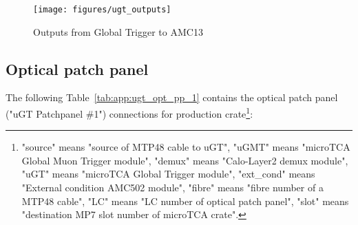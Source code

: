 \begin{figure}[htb]
\centering
\texttt{[image: figures/ugt\_outputs]}
\caption{Outputs from Global Trigger to AMC13}
\label{fig:app:ugt_outputs}
\end{figure}

\clearpage

\subsection{Optical patch panel}\label{sec:app:app_d}

The following Table~\ref{tab:app:ugt_opt_pp_1} contains the optical patch panel ("uGT Patchpanel \#1") connections for production crate\footnote{"source" means "source of MTP48 cable to uGT", "uGMT" means "microTCA Global Muon Trigger module", "demux" means "Calo-Layer2 demux module", "uGT" means "microTCA Global Trigger module", "ext\_cond" means "External condition AMC502 module", "fibre" means "fibre number of a MTP48 cable", "LC" means "LC number of optical patch panel", "slot" means "destination MP7 slot number of microTCA crate".\label{note_ugt_opt_pp_1}}:

